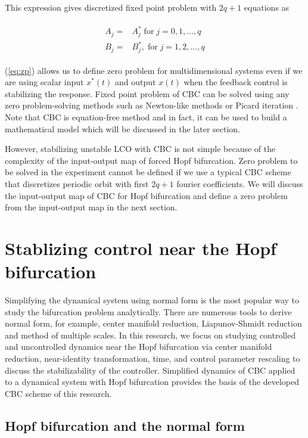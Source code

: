 \documentclass[openacc]{rsproca_new}%
\newcommand{\Eref}[1]{(\ref{#1})}
\begin{document}
\noindent This expression gives discretized fixed point problem with $2q+1$ equations as

\begin{align}\label{eq:zp}
  \begin{split}
  A_j=&A^*_j \; \textrm{for} \; j=0,1,\ldots,q\\
  B_j=&B^*_j,\; \textrm{for} \; j=1,2,\ldots,q
\end{split}
\end{align}

\noindent \Eref{eq:zp} allows us to define zero problem for multidimensional systems even if we are using scalar input $x^*(t)$ and output $x(t)$ when the feedback control is stabilizing the response. Fixed point problem of CBC can be solved using any zero problem-solving methods such as Newton-like methods \cite{schilder2015experimental} or Picard iteration \cite{barton2013systematic}. Note that CBC is equation-free method and in fact, it can be used to build a mathematical model which will be discussed in the later section.

However, stabilizing unstable LCO with CBC is not simple because of the complexity of the input-output map of forced Hopf bifurcation. Zero problem to be solved in the experiment cannot be defined if we use a typical CBC scheme that discretizes periodic orbit with first $2q+1$ fourier coefficients. We will discuss the input-output map of CBC for Hopf bifurcation and define a zero problem from the input-output map in the next section.

\section{Stablizing control near the Hopf bifurcation}\label{SNH}

Simplifying the dynamical system using normal form is the most popular way to study the bifurcation problem analytically. There are numerous tools to derive normal form, for example, center manifold reduction, Liapunov-Shmidt reduction and method of multiple scales. In this research, we focus on studying controlled and uncontrolled dynamics near the Hopf bifurcation via center manifold reduction, near-identity transformation, time, and control parameter rescaling to discuss the stabilizability of the controller. Simplified dynamics of CBC applied to a dynamical system with Hopf bifurcation provides the basis of the developed CBC scheme of this research.

\subsection{Hopf bifurcation and the normal form}\label{SNF}
\end{document}
